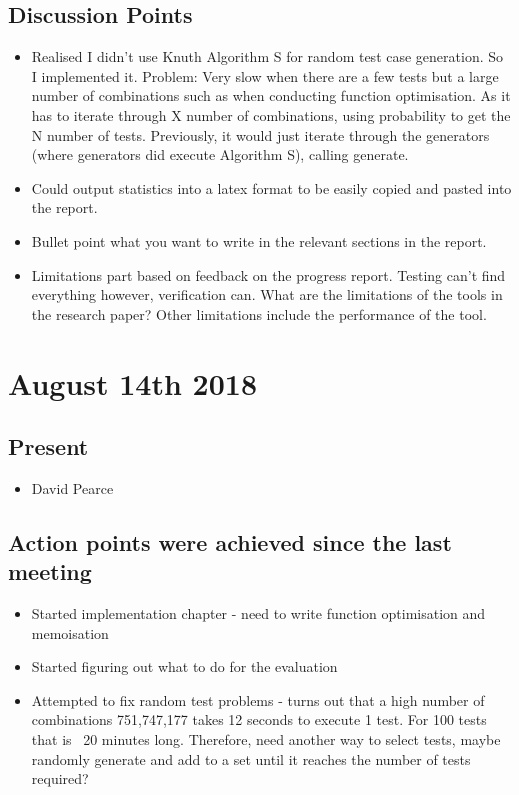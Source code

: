 \documentclass[]{article}
\begin{document}
\subsection{Discussion Points}
\begin{itemize}
	\item Realised I didn't use Knuth Algorithm S for random test case generation. So I implemented it. Problem: Very slow when there are a few tests but a large number of combinations such as when conducting function optimisation. As it has to iterate through X number of combinations, using probability to get the N number of tests. Previously, it would just iterate through the generators (where generators did execute Algorithm S), calling generate.
	\item Could output statistics into a latex format to be easily copied and pasted into the report.
	\item Bullet point what you want to write in the relevant sections in the report.
	\item Limitations part based on feedback on the progress report. Testing can't find everything however, verification can. What are the limitations of the tools in the research paper? Other limitations include the performance of the tool.
\end{itemize}


\section{August 14th 2018}
\subsection{Present}
\begin{itemize}
	\item David Pearce
\end{itemize}

\subsection{Action points were achieved since the last meeting}
\begin{itemize}
	\item Started implementation chapter - need to write function optimisation and memoisation
	\item Started figuring out what to do for the evaluation
	\item Attempted to fix random test problems - turns out that a high number of combinations 751,747,177 takes 12 seconds to execute 1 test. For 100 tests that is ~20 minutes long. Therefore, need another way to select tests, maybe randomly generate and add to a set until it reaches the number of tests required?
\end{itemize}
\end{document}
